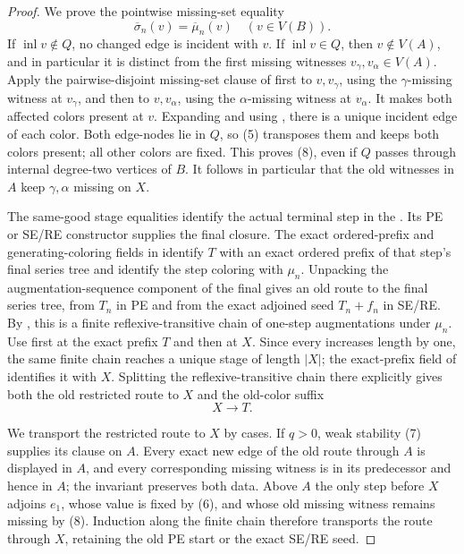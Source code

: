\begin{proof}
We prove the pointwise missing-set equality
\[
 \overline\sigma_n(v)=\overline\mu_n(v)
                    \quad(v\in V(B)).                        \tag{8}
\]
If \(\operatorname{inl}v\notin Q\), no changed edge is incident with
\(v\).  If \(\operatorname{inl}v\in Q\), then \(v\notin V(A)\), and in
particular it is distinct from the first missing witnesses
\(v_\gamma,v_\alpha\in V(A)\).  Apply the pairwise-disjoint missing-set
clause of  first to
\(v,v_\gamma\), using the \(\gamma\)-missing witness at \(v_\gamma\),
and then to \(v,v_\alpha\), using the \(\alpha\)-missing witness at
\(v_\alpha\).  It makes both affected colors present at \(v\).  Expanding
 and using
, there is a unique incident edge of each
color.  Both edge-nodes lie in \(Q\), so (5) transposes them and keeps
both colors present; all other colors are fixed.  This proves (8), even
if \(Q\) passes through internal degree-two vertices of \(B\).
It follows in particular that the old witnesses in \(A\) keep
\(\gamma,\alpha\) missing on \(X\).                              \(\tag{9}\)

The same-good stage equalities identify the actual terminal step in the
.  Its PE or SE/RE
 constructor supplies the final closure.
The exact ordered-prefix and generating-coloring fields in
 identify \(T\) with an exact ordered
prefix of that step's final series tree and identify the step coloring
with \(\mu_n\).  Unpacking the augmentation-sequence component of the
final  gives an old route to the final series
tree, from \(T_n\) in PE and from the exact adjoined seed \(T_n+f_n\) in
SE/RE.  By , this is a finite
reflexive-transitive chain of one-step augmentations under \(\mu_n\).
Use  first at the exact
prefix \(T\) and then at \(X\).  Since every
 increases length by one, the same finite
chain reaches a unique stage of length \(|X|\); the exact-prefix field of
 identifies it with \(X\).  Splitting the
reflexive-transitive chain there explicitly gives both the old restricted
route to \(X\) and the old-color suffix
\[
                         X\longrightarrow T.                 \tag{11}
\]

We transport the restricted route to \(X\) by cases.  If \(q>0\), weak
stability (7) supplies its  clause on
\(A\).  Every exact new edge of the old route through \(A\) is displayed
in \(A\), and every corresponding missing witness is in its predecessor
and hence in \(A\); the invariant preserves both data.  Above \(A\) the
only step before \(X\) adjoins \(e_1\), whose value is fixed by (6), and
whose old missing witness remains missing by (8).  Induction along the
finite chain therefore transports the route through \(X\), retaining the
old PE start or the exact SE/RE seed.


\end{proof}
